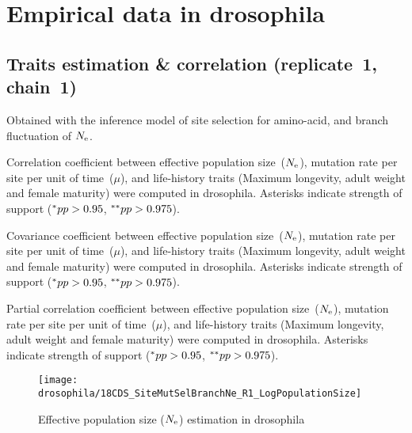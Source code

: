 \section{Empirical data in drosophila}
\label{sec:empirical-data-in-drosophila}

\subsection{Traits estimation \& correlation (replicate~1, chain~1)}
Obtained with the inference model of site selection for amino-acid, and branch fluctuation of $N_{\mathrm{e}}$.

\begin{table}[H]
    
    \caption[Correlation coefficient matrix in drosophila ($\dnds$)]{
    Correlation coefficient between effective population size~($N_{\mathrm{e}}$), mutation rate per site per unit of time~($\mu$), and life-history traits (Maximum longevity, adult weight and female maturity) were computed in drosophila.
    Asterisks indicate strength of support ($\smash{^{*}} pp > 0.95$, $\smash{^{**}} pp > 0.975$).}
\end{table}

\begin{table}[H]
    
    \caption[Covariance matrix in drosophila]{
    Covariance coefficient between effective population size~($N_{\mathrm{e}}$), mutation rate per site per unit of time~($\mu$), and life-history traits (Maximum longevity, adult weight and female maturity) were computed in drosophila.
    Asterisks indicate strength of support ($\smash{^{*}} pp > 0.95$, $\smash{^{**}} pp > 0.975$).}
\end{table}

\begin{table}[H]
    
    \caption[Partial correlation coefficient matrix in drosophila]{
    Partial correlation coefficient between effective population size~($N_{\mathrm{e}}$), mutation rate per site per unit of time~($\mu$), and life-history traits (Maximum longevity, adult weight and female maturity) were computed in drosophila.
    Asterisks indicate strength of support ($\smash{^{*}} pp > 0.95$, $\smash{^{**}} pp > 0.975$).}
\end{table}

\begin{figure}[H]
    \centering
    \texttt{[image: drosophila/18CDS\_SiteMutSelBranchNe\_R1\_LogPopulationSize]}
    \caption[Effective population size estimation in drosophila]{Effective population size ($N_{\mathrm{e}}$) estimation in drosophila}
\end{figure}

